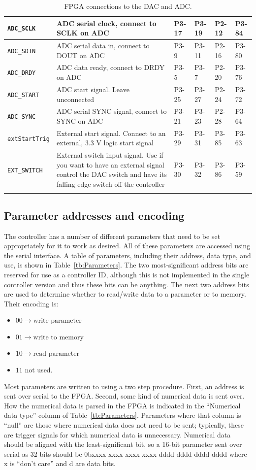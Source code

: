 \documentclass{article}
\begin{document}
\begin{longtable}[c]{|l|p{7cm}|l|l|l|l|}
	\verb|ADC_SCLK|			&ADC serial clock, connect to SCLK on ADC					&P3-17				&P3-19				&P2-12				&P3-84\\\hline
	\verb|ADC_SDIN|			&ADC serial data in, connect to DOUT on ADC					&P3-9				&P3-11				&P2-16				&P3-80\\\hline
	\verb|ADC_DRDY|			&ADC data ready, connect to DRDY on ADC						&P3-5				&P3-7				&P2-20				&P3-76\\\hline
	\verb|ADC_START|		&ADC start signal.  Leave unconnected						&P3-25				&P3-27				&P2-24				&P3-72\\\hline
	\verb|ADC_SYNC|			&ADC serial SYNC signal, connect to SYNC on ADC				&P3-21				&P3-23				&P2-28				&P3-64\\\hline
	\hline
	\verb|extStartTrig|		&External start signal.  Connect to an external, 3.3 V logic start signal					&P3-29		&P3-31		&P3-85		&P3-63\\\hline
	\verb|EXT_SWITCH|		&External switch input signal.  Use if you want to have an external signal control the DAC switch and have its falling edge switch off the controller		&P3-30	&P3-32	&P3-86	&P3-59\\\hline
	\caption{FPGA connections to the DAC and ADC.}
	\label{tb:connections}
\end{longtable}

\subsection{Parameter addresses and encoding}
\label{ssec:parameters}
The controller has a number of different parameters that need to be set appropriately for it to work as desired.  All of these parameters are accessed using the serial interface.  A table of parameters, including their address, data type, and use, is shown in Table~\ref{tb:Parameters}.  The two most-significant address bits are reserved for use as a controller ID, although this is not implemented in the single controller version and thus these bits can be anything.  The next two address bits are used to determine whether to read/write data to a parameter or to memory.  Their encoding is:
\begin{itemize}
	\item $00 \rightarrow \text{write parameter}$
	\item $01 \rightarrow \text{write to memory}$
	\item $10 \rightarrow \text{read parameter}$
	\item $11$ not used.
\end{itemize}
Most parameters are written to using a two step procedure.  First, an address is sent over serial to the FPGA.  Second, some kind of numerical data is sent over.  How the numerical data is parsed in the FPGA is indicated in the ``Numerical data type'' column of Table~\ref{tb:Parameters}.  Parameters where that column is ``null'' are those where numerical data does not need to be sent; typically, these are trigger signals for which numerical data is unnecessary.  Numerical data should be aligned with the least-significant bit, so a 16-bit parameter sent over serial as 32 bits should be 0bxxxx xxxx xxxx xxxx dddd dddd dddd dddd where x is ``don't care'' and d are data bits.
\end{document}
